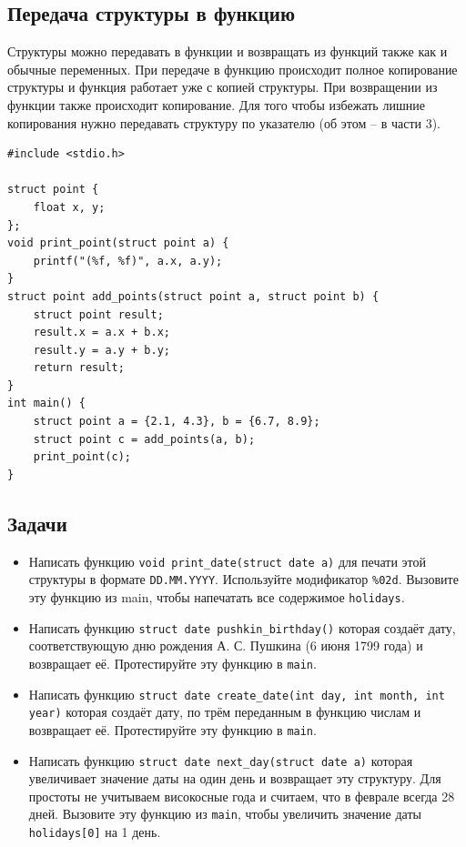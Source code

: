 \documentclass{article}
\begin{document}
\subsection*{Передача структуры в функцию}
Структуры можно передавать в функции и возвращать из функций также как и обычные переменных. При передаче в функцию происходит полное копирование структуры и функция работает уже с копией структуры. При возвращении из функции также происходит копирование. Для того чтобы избежать лишние копирования нужно передавать структуру по указателю (об этом -- в части 3).

\begin{lstlisting}
#include <stdio.h>

struct point {
    float x, y;
};
void print_point(struct point a) {
    printf("(%f, %f)", a.x, a.y);
}
struct point add_points(struct point a, struct point b) {
    struct point result;
    result.x = a.x + b.x;
    result.y = a.y + b.y;
    return result;
}
int main() {
    struct point a = {2.1, 4.3}, b = {6.7, 8.9};
    struct point c = add_points(a, b);
    print_point(c);
}
\end{lstlisting}

\subsection*{Задачи}
\begin{itemize}
\item Написать функцию \texttt{void print\_date(struct date a)} для печати этой структуры в формате \texttt{DD.MM.YYYY}. Используйте модификатор \texttt{\%02d}. Вызовите эту функцию из main, чтобы напечатать все содержимое \texttt{holidays}.

\item Написать функцию \texttt{struct date pushkin\_birthday()} которая создаёт дату, соответствующую дню рождения А. С. Пушкина (6 июня 1799 года) и возвращает её. Протестируйте эту функцию в \texttt{main}.

\item Написать функцию \texttt{struct date create\_date(int day, int month, int year)} которая создаёт дату, по трём переданным в функцию числам  и возвращает её. Протестируйте эту функцию в \texttt{main}.


\item Написать функцию \texttt{struct date next\_day(struct date a)} которая увеличивает значение даты на один день и возвращает эту структуру. Для простоты не учитываем високосные года и считаем, что в феврале всегда 28 дней. Вызовите эту функцию из \texttt{main}, чтобы увеличить значение даты \texttt{holidays[0]} на 1 день.
\end{itemize}
\newpage
\end{document}
